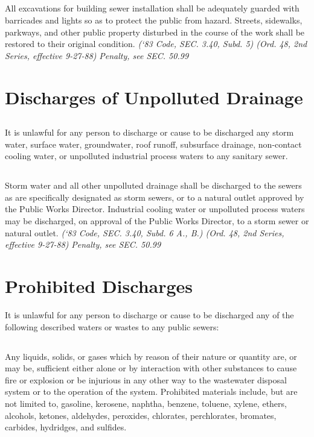 \documentclass[code.tex]{subfiles}
\begin{document}
\subsection{}
All excavations for building sewer installation shall be adequately guarded with barricades and lights so as to protect the public from hazard.  Streets, sidewalks, parkways, and other public property disturbed in the course of the work shall be restored to their original condition.\newline
\emph{(‘83 Code, SEC. 3.40, Subd. 5) (Ord. 48, 2nd Series, effective 9-27-88)}\newline
\emph{Penalty, see SEC. 50.99}
\section{Discharges of Unpolluted Drainage}
\subsection{}
It is unlawful for any person to discharge or cause to be discharged any storm water, surface water, groundwater, roof runoff, subsurface drainage, non-contact cooling water, or unpolluted industrial process waters to any sanitary sewer.
\subsection{}
Storm water and all other unpolluted drainage shall be discharged to the sewers as are specifically designated as storm sewers, or to a natural outlet approved by the Public Works Director.  Industrial cooling water or unpolluted process waters may be discharged, on approval of the Public Works Director, to a storm sewer or natural outlet.\newline
\emph{(‘83 Code, SEC. 3.40, Subd. 6 A., B.) (Ord. 48, 2nd Series, effective 9-27-88)}\newline
\emph{Penalty, see SEC. 50.99}
\section{Prohibited Discharges}
It is unlawful for any person to discharge or cause to be discharged any of the following described waters or wastes to any public sewers:
\subsection{}
Any liquids, solids, or gases which by reason of their nature or quantity are, or may be, sufficient either alone or by interaction with other substances to cause fire or explosion or be injurious in any other way to the wastewater disposal system or to the operation of the system.  Prohibited materials include, but are not limited to, gasoline, kerosene, naphtha, benzene, toluene, xylene, ethers, alcohols, ketones, aldehydes, peroxides, chlorates, perchlorates, bromates, carbides, hydridges, and sulfides.
\end{document}
